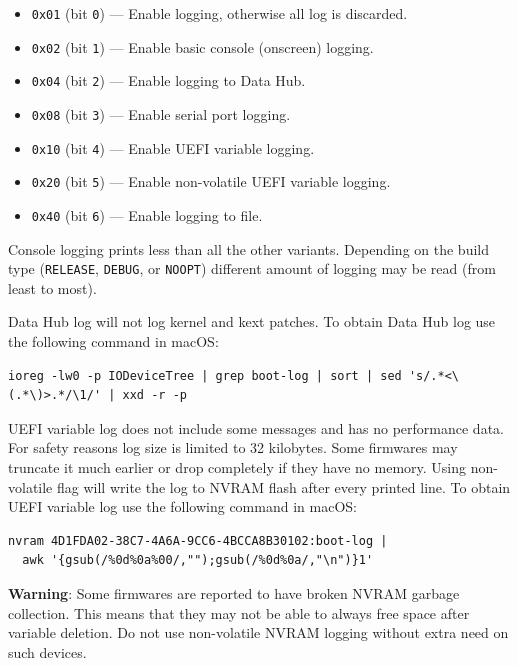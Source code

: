 \documentclass[]{article}
\providecommand{\tightlist}{%
  \setlength{\itemsep}{0pt}\setlength{\parskip}{0pt}}
\begin{document}
\begin{enumerate}
  \begin{itemize}
  \tightlist
    \item \texttt{0x01} (bit \texttt{0}) --- Enable logging, otherwise all log is discarded.
    \item \texttt{0x02} (bit \texttt{1}) --- Enable basic console (onscreen) logging.
    \item \texttt{0x04} (bit \texttt{2}) --- Enable logging to Data Hub.
    \item \texttt{0x08} (bit \texttt{3}) --- Enable serial port logging.
    \item \texttt{0x10} (bit \texttt{4}) --- Enable UEFI variable logging.
    \item \texttt{0x20} (bit \texttt{5}) --- Enable non-volatile UEFI variable logging.
    \item \texttt{0x40} (bit \texttt{6}) --- Enable logging to file.
  \end{itemize}

  Console logging prints less than all the other variants.
  Depending on the build type (\texttt{RELEASE}, \texttt{DEBUG}, or
  \texttt{NOOPT}) different amount of logging may be read (from least to most).

  Data Hub log will not log kernel and kext patches. To obtain Data Hub log use
  the following command in macOS:
\begin{lstlisting}[label=dhublog, style=ocbash]
ioreg -lw0 -p IODeviceTree | grep boot-log | sort | sed 's/.*<\(.*\)>.*/\1/' | xxd -r -p
\end{lstlisting}

  UEFI variable log does not include some messages and has no performance data. For safety
  reasons log size is limited to 32 kilobytes. Some firmwares may truncate it much earlier
  or drop completely if they have no memory. Using non-volatile flag will write the log to
  NVRAM flash after every printed line. To obtain UEFI variable log use the following command
  in macOS:
\begin{lstlisting}[label=nvramlog, style=ocbash]
nvram 4D1FDA02-38C7-4A6A-9CC6-4BCCA8B30102:boot-log |
  awk '{gsub(/%0d%0a%00/,"");gsub(/%0d%0a/,"\n")}1'
\end{lstlisting}

  \textbf{Warning}: Some firmwares are reported to have broken NVRAM garbage collection.
  This means that they may not be able to always free space after variable deletion.
  Do not use non-volatile NVRAM logging without extra need on such devices.


\end{enumerate}
\end{document}
